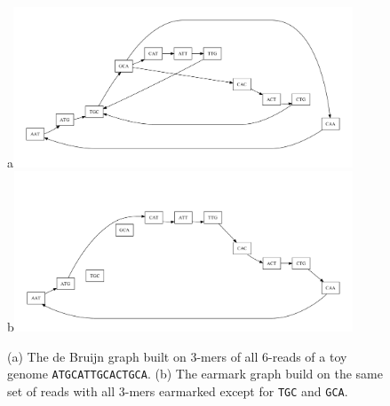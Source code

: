 \documentclass[12pt]{article}
\begin{document}
\begin{figure}
\caption{(a) The de Bruijn graph built on $3$-mers 
of all $6$-reads of a toy genome {\tt ATGCATTGCACTGCA}.
(b) The earmark graph build on the same set of reads with all $3$-mers earmarked except for
{\tt TGC} and {\tt GCA}.}\label{fig:debruijn}
\begin{center}
a\includegraphics[width=0.9\textwidth]{ATGCATTGCACTGCA_debruijn.pdf}\\
b\includegraphics[width=0.9\textwidth]{ATGCATTGCACTGCA_earmark.pdf}\\
\end{center}
\end{figure}
\end{document}
